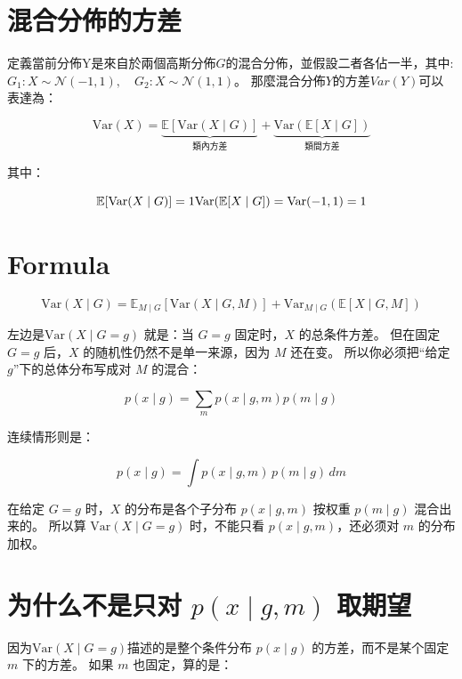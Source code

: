\section{混合分佈的方差}

定義當前分佈Y是來自於兩個高斯分佈\(G\)的混合分佈，並假設二者各佔一半，其中: \(G_1: X\sim \mathcal N(-1,1),\quad G_2: X\sim \mathcal N(1,1)\)。
那麼混合分佈\(Y\)的方差\(Var(Y)\)可以表達為：

\[
\mathrm{Var}(X)=\underbrace{\boxed{ \mathbb E[\mathrm{Var}(X\mid G)]}}_{\text{類內方差}} + \underbrace{\boxed{\mathrm{Var}(\mathbb E[X\mid G])}}_{\text{類間方差}}
\]

其中：

\[
\mathbb E[\mathrm{Var}(X\mid G)] = 1 \\
\mathrm{Var}(\mathbb E[X\mid G]) = \mathrm{Var}(-1,1)=1
\]

\section{Formula}

\[
\mathrm{Var}(X\mid G)
=
\mathbb{E}_{M\mid G}\!\left[\mathrm{Var}(X\mid G,M)\right]
+
\mathrm{Var}_{M\mid G}\!\left(\mathbb{E}[X\mid G,M]\right)
\]

左边是\( \mathrm{Var}(X\mid G=g) \) 就是：当 \(G=g\) 固定时，\(X\) 的总条件方差。
但在固定 \(G=g\) 后，\(X\) 的随机性仍然不是单一来源，因为 \(M\) 还在变。
所以你必须把“给定 \(g\)”下的总体分布写成对 \(M\) 的混合：

\[
p(x\mid g)=\sum_m p(x\mid g,m)p(m\mid g)
\]

连续情形则是：

\[
p(x\mid g)=\int p(x\mid g,m)\,p(m\mid g)\,dm
\]

在给定 \(G=g\) 时，\(X\) 的分布是各个子分布 \(p(x\mid g,m)\) 按权重 \(p(m\mid g)\) 混合出来的。
所以算 \(\mathrm{Var}(X\mid G=g)\) 时，不能只看 \(p(x\mid g,m)\)，还必须对 \(m\) 的分布加权。

\section{为什么不是只对 \(p(x\mid g,m)\) 取期望}

因为\(\mathrm{Var}(X\mid G=g)\)描述的是整个条件分布 \(p(x\mid g)\) 的方差，而不是某个固定 \(m\) 下的方差。
如果 \(m\) 也固定，算的是：

